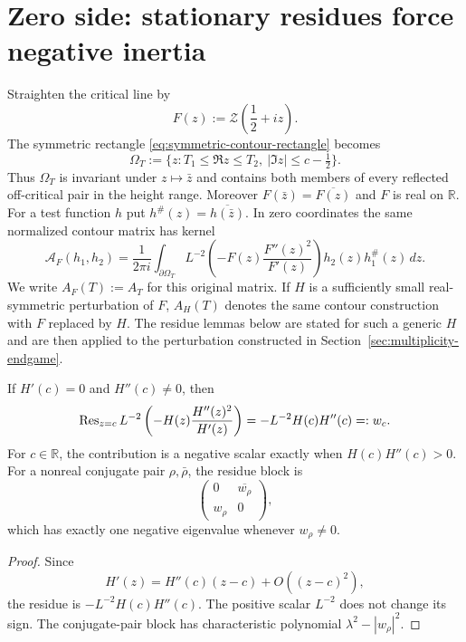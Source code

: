 \section{Zero side: stationary residues force negative inertia}
\label{sec:zero-side}

Straighten the critical line by
\[
F(z):=\mathscr Z\!\left(\frac12+iz\right).
\]
The symmetric rectangle \eqref{eq:symmetric-contour-rectangle} becomes
\begin{equation}
\Omega_T:=\{z:T_1\le\Re z\le T_2,\ |\Im z|\le c-\tfrac12\}.
\label{eq:zero-rectangle}
\end{equation}
Thus $\Omega_T$ is invariant under $z\mapsto\bar z$ and contains both members
of every reflected off-critical pair in the height range. Moreover
$F(\bar z)=\overline{F(z)}$ and $F$ is real on $\mathbb R$. For a test
function $h$ put $h^\#(z)=\overline{h(\bar z)}$. In zero coordinates the same
normalized contour matrix has kernel
\begin{equation}
\mathcal A_F(h_1,h_2)
=\frac1{2\pi i}\int_{\partial\Omega_T}
L^{-2}\left(-F(z)\frac{F''(z)^2}{F'(z)}\right)
 h_2(z)h_1^\#(z)\,dz.
\label{eq:zero-kernel}
\end{equation}
We write $A_F(T):=A_T$ for this original matrix. If $H$ is a sufficiently
small real-symmetric perturbation of $F$, $A_H(T)$ denotes the same contour
construction with $F$ replaced by $H$. The residue lemmas below are stated for
such a generic $H$ and are then applied to the perturbation constructed in
Section~\ref{sec:multiplicity-endgame}.

\begin{lemma}
\label{lem:stationary-blocks}
If $H'(c)=0$ and $H''(c)\neq0$, then
\[
\operatorname{Res}_{z=c}
L^{-2}\left(-H(z)\frac{H''(z)^2}{H'(z)}\right)
=-L^{-2}H(c)H''(c)=:w_c.
\]
For $c\in\mathbb R$, the contribution is a negative scalar exactly when
$H(c)H''(c)>0$. For a nonreal conjugate pair $\rho,\bar\rho$, the residue block
is
\[
\begin{pmatrix}
0&\overline{w_\rho}\\
w_\rho&0
\end{pmatrix},
\]
which has exactly one negative eigenvalue whenever $w_\rho\neq0$.
\end{lemma}

\begin{proof}
Since
\[
H'(z)=H''(c)(z-c)+O((z-c)^2),
\]
the residue is $-L^{-2}H(c)H''(c)$. The positive scalar $L^{-2}$ does not
change its sign. The conjugate-pair block has characteristic
polynomial $\lambda^2-|w_\rho|^2$.
\end{proof}

